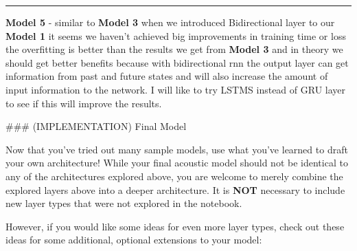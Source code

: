\documentclass[11pt]{article}
\begin{document}
\begin{center}\rule{0.5\linewidth}{\linethickness}\end{center}

\textbf{Model 5} - similar to \textbf{Model 3} when we introduced
Bidirectional layer to our \textbf{Model 1} it seems we haven't achieved
big improvements in training time or loss the overfitting is better than
the results we get from \textbf{Model 3} and in theory we should get
better benefits because with bidirectional rnn the output layer can get
information from past and future states and will also increase the
amount of input information to the network. I will like to try LSTMS
instead of GRU layer to see if this will improve the results.

     \#\#\# (IMPLEMENTATION) Final Model

Now that you've tried out many sample models, use what you've learned to
draft your own architecture! While your final acoustic model should not
be identical to any of the architectures explored above, you are welcome
to merely combine the explored layers above into a deeper architecture.
It is \textbf{NOT} necessary to include new layer types that were not
explored in the notebook.

However, if you would like some ideas for even more layer types, check
out these ideas for some additional, optional extensions to your model:
\end{document}
